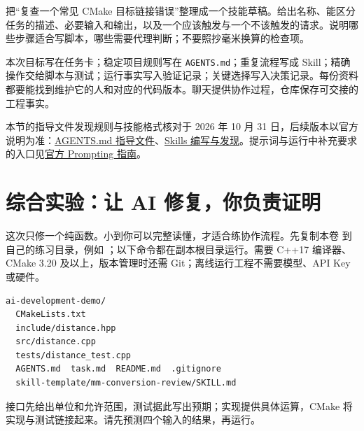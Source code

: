 \begin{exercise}\label{ex:ai-skill}
把“复查一个常见 CMake 目标链接错误”整理成一个技能草稿。给出名称、能区分任务的描述、必要输入和输出，以及一个应该触发与一个不该触发的请求。说明哪些步骤适合写脚本，哪些需要代理判断；不要照抄毫米换算的检查项。
\end{exercise}

\begin{conclusion}
本次目标写在任务卡；稳定项目规则写在 \texttt{AGENTS.md}；重复流程写成 Skill；精确操作交给脚本与测试；运行事实写入验证记录；关键选择写入决策记录。每份资料都要能找到维护它的人和对应的代码版本。聊天提供协作过程，仓库保存可交接的工程事实。
\end{conclusion}

本节的指导文件发现规则与技能格式核对于 2026 年 10 月 31 日，后续版本以官方说明为准：\href{https://learn.chatgpt.com/docs/agent-configuration/agents-md}{AGENTS.md 指导文件}、\href{https://learn.chatgpt.com/docs/build-skills}{Skills 编写与发现}。提示词与运行中补充要求的入口见\href{https://learn.chatgpt.com/docs/prompting}{官方 Prompting 指南}。

\section{综合实验：让 AI 修复，你负责证明}
\label{sec:ai-lab}

这次只修一个纯函数。小到你可以完整读懂，才适合练协作流程。先复制本卷  到自己的练习目录，例如 ；以下命令都在副本根目录运行。需要 C++17 编译器、CMake 3.20 及以上，版本管理时还需 Git；离线运行工程不需要模型、API Key 或硬件。

\begin{lstlisting}[language={}]
ai-development-demo/
  CMakeLists.txt
  include/distance.hpp
  src/distance.cpp
  tests/distance_test.cpp
  AGENTS.md  task.md  README.md  .gitignore
  skill-template/mm-conversion-review/SKILL.md
\end{lstlisting}
接口先给出单位和允许范围，测试据此写出预期；实现提供具体运算，CMake 将实现与测试链接起来。请先预测四个输入的结果，再运行。


\noindent\begin{minipage}{\linewidth}

\end{minipage}\par
{}



